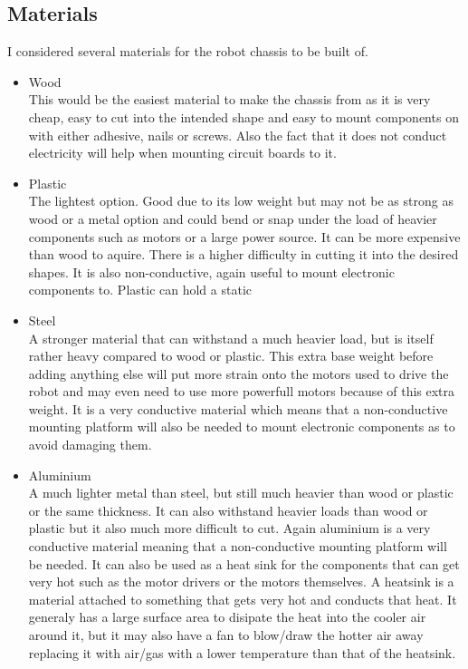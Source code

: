 \subsection{Materials}
I considered several materials for the robot chassis to be built of.
\begin{itemize}
\item Wood
\\This would be the easiest material to make the chassis from as it is very cheap, easy to cut into the intended shape and easy to mount components on with either adhesive, nails or screws.  Also the fact that it does not conduct electricity will help when mounting circuit boards to it.

\item Plastic
\\The lightest option.  Good due to its low weight but may not be as strong as wood or a metal option and could bend or snap under the load of heavier components such as motors or a large power source.  It can be more expensive than wood to aquire.  There is a higher difficulty in cutting it into the desired shapes.  It is also non-conductive, again useful to mount electronic components to.  Plastic can hold a static

\item Steel
\\A stronger material that can withstand a much heavier load, but is itself rather heavy compared to wood or plastic.  This extra base weight before adding anything else will put more strain onto the motors used to drive the robot and may even need to use more powerfull motors because of this extra weight.  It is a very conductive material which means that a non-conductive mounting platform will also be needed to mount electronic components as to avoid damaging them.

\item Aluminium
\\A much lighter metal than steel, but still much heavier than wood or plastic or the same thickness.  It can also withstand heavier loads than wood or plastic but it also much more difficult to cut.  Again aluminium is a very conductive material meaning that a non-conductive mounting platform will be needed.  It can also be used as a heat sink for the components that can get very hot such as the motor drivers or the motors themselves.  A heatsink is a material attached to something that gets very hot and conducts that heat.  It generaly has a large surface area to disipate the heat into the cooler air around it, but it may also have a fan to blow/draw the hotter air away replacing it with air/gas with a lower temperature than that of the heatsink.

\end{itemize}

